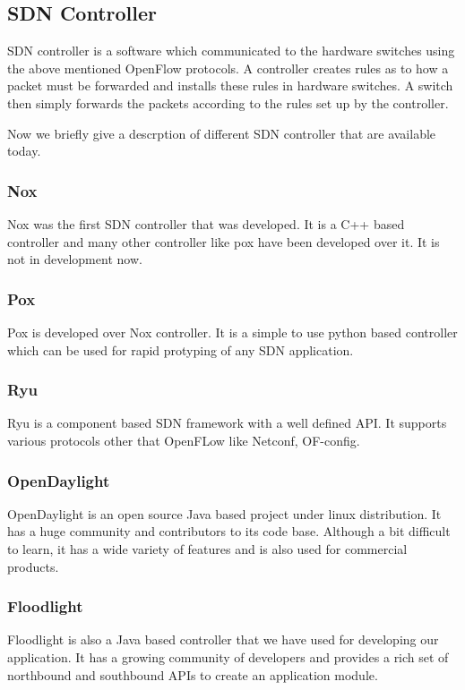 \subsection{SDN Controller}
SDN controller is a software which communicated to the hardware switches using the above mentioned OpenFlow protocols. A controller creates rules as to how a packet must be forwarded and installs these rules in hardware switches. A switch then simply forwards the packets according to the rules set up by the controller.

Now we briefly give a descrption of different SDN controller that are available today.

\subsubsection{Nox}
Nox was the first SDN controller that was developed. It is a C++ based controller and many other controller like pox have been developed over it. It is not in development now.

\subsubsection{Pox}
Pox is developed over Nox controller. It is a simple to use python based controller which can be used for rapid protyping of any SDN application.

\subsubsection{Ryu}
Ryu is a component based SDN framework with a well defined API. It supports various protocols other that OpenFLow like Netconf, OF-config.

\subsubsection{OpenDaylight}
OpenDaylight is an open source Java based project under linux distribution. It has a huge community and contributors to its code base. Although a bit difficult to learn, it has a wide variety of features and is also used for commercial products.

\subsubsection{Floodlight}
Floodlight is also a Java based controller that we have used for developing our application. It has a growing community of developers and provides a rich set of northbound and southbound APIs to create an application module. 

